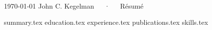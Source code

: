\documentclass[11pt, letterpaper]{awesome-cv}
\newcommand*{\sectiondir}{resume/}
\begin{document}
\makecvheader%

\makecvfooter%
  {\today}
  {John C. Kegelman~~~·~~~Résumé}
  {\thepage}

{summary.tex}
{education.tex}
{experience.tex}
{publications.tex}
{skills.tex}
\end{document}

